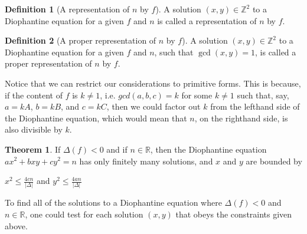 \documentclass{article}
\theoremstyle{definition}
\newtheorem{definition}{Definition}[section]
\theoremstyle{theorem}
\newtheorem{theorem}{Theorem}[section]
\theoremstyle{example}
\theoremstyle{corollary}
\begin{document}
\bigskip

\theoremstyle{definition}
\begin{definition}[A representation of \(n\) by \(f\)]
A solution \((x, y) \in \mathbb{Z}^{2}\) to a Diophantine equation for a given \(f\) and \(n\) is called a representation of \(n\) by \(f\).
\end{definition}

\bigskip

\theoremstyle{definition}
\begin{definition}[A proper representation of \(n\) by \(f\)]
A solution \((x, y) \in \mathbb{Z}^{2}\) to a Diophantine equation for a given \(f\) and \(n\), such that \(\gcd(x, y) = 1\), is called a proper representation of \(n\) by \(f\).
\end{definition}

\bigskip

Notice that we can restrict our considerations to primitive forms. This is because, if the content of \(f\) is \(k \ne 1\), i.e. \(gcd(a, b, c) = k\) for some \(k \ne 1\) such that, say, \(a = kA\), \(b = kB\), and \(c = kC\), then we could factor out \(k\) from the lefthand side of the Diophantine equation, which would mean that \(n\), on the righthand side, is also divisible by \(k\).

\bigskip

\theoremstyle{theorem}
\begin{theorem}
If \(\Delta(f) < 0\) and if \(n \in \mathbb{R}\), then the Diophantine equation \(ax^{2} + bxy + cy^{2} = n\) has only finitely many solutions, and \(x\) and \(y\) are bounded by
\begin{center}
\(x^{2} \le \frac{4cn}{|\Delta |}\) \quad \quad and \quad \quad \(y^{2} \le \frac{4an}{|\Delta |}\)
\end{center}
\end{theorem}

\bigskip

To find all of the solutions to a Diophantine equation where \(\Delta(f) < 0\) and \(n \in \mathbb{R}\), one could test for each solution \((x, y)\) that obeys the constraints given above.

\bigskip
\end{document}
